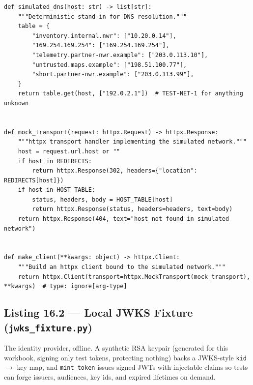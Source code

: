 \begin{verbatim}
def simulated_dns(host: str) -> list[str]:
    """Deterministic stand-in for DNS resolution."""
    table = {
        "inventory.internal.nwr": ["10.20.0.14"],
        "169.254.169.254": ["169.254.169.254"],
        "telemetry.partner-nwr.example": ["203.0.113.10"],
        "untrusted.maps.example": ["198.51.100.77"],
        "short.partner-nwr.example": ["203.0.113.99"],
    }
    return table.get(host, ["192.0.2.1"])  # TEST-NET-1 for anything unknown


def mock_transport(request: httpx.Request) -> httpx.Response:
    """httpx transport handler implementing the simulated network."""
    host = request.url.host or ""
    if host in REDIRECTS:
        return httpx.Response(302, headers={"location": REDIRECTS[host]})
    if host in HOST_TABLE:
        status, headers, body = HOST_TABLE[host]
        return httpx.Response(status, headers=headers, text=body)
    return httpx.Response(404, text="host not found in simulated network")


def make_client(**kwargs: object) -> httpx.Client:
    """Build an httpx client bound to the simulated network."""
    return httpx.Client(transport=httpx.MockTransport(mock_transport), **kwargs)  # type: ignore[arg-type]
\end{verbatim}

\subsection{Listing 16.2 --- Local JWKS Fixture (\texttt{jwks\_fixture.py})}
\label{lst:ch16-jwks}

The identity provider, offline. A synthetic RSA keypair (generated for this
workbook, signing only test tokens, protecting nothing) backs a JWKS-style
\texttt{kid} $\to$ key map, and \texttt{mint\_token} issues signed JWTs with
injectable claims so tests can forge issuers, audiences, key ids, and
expired lifetimes on demand.

